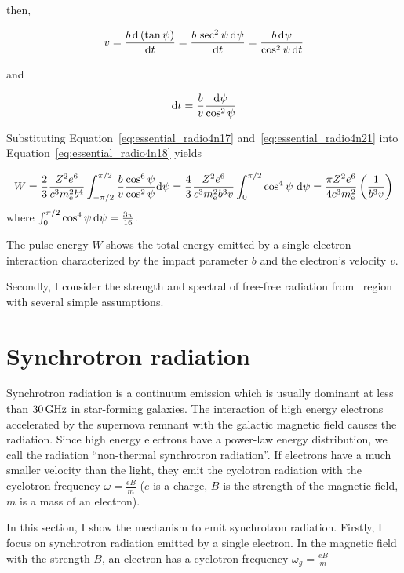 then,

\begin{equation}\label{eq:essential_radio4n20}
    v=\frac{b\,\mathrm{d}\left(\tan \psi\right)}{\mathrm{d} t}=\frac{b\,\sec ^{2} \psi\,\mathrm{d} \psi}{\mathrm{d} t}=\frac{b\,\mathrm{d} \psi}{\cos ^{2}\psi\,\mathrm{d} t}
\end{equation}

and

\begin{equation}\label{eq:essential_radio4n21}
    \mathrm{d} t=\frac{b}{v} \frac{\mathrm{d} \psi}{\cos ^{2} \psi}
\end{equation}

Substituting Equation~\ref{eq:essential_radio4n17} and~\ref{eq:essential_radio4n21} into Equation~\ref{eq:essential_radio4n18} yields

\begin{equation}\label{eq:essential_radio4n22}
    W=\frac{2}{3} \frac{Z^{2} e^{6}}{c^{3} m_{\mathrm{e}}^{2} b^{4}} \int_{-\pi / 2}^{\pi / 2} \frac{b}{v} \frac{\cos ^{6} \psi}{\cos ^{2} \psi} \mathrm{d} \psi=\frac{4}{3} \frac{Z^{2} e^{6}}{c^{3} m_{\mathrm{e}}^{2} b^{3} v} \int_{0}^{\pi / 2} \cos ^{4} \psi\ \mathrm{d} \psi = \frac{\pi Z^2 e^6}{4 c^3 m_{\mathrm{e}}^2}\left(\frac{1}{b^3v}\right)
\end{equation}
where $\int_{0}^{\pi / 2} \cos ^{4} \psi\,\mathrm{d} \psi=\frac{3 \pi}{16}$.

The pulse energy $W$ shows the total energy emitted by a single electron interaction characterized by the impact parameter $b$ and the electron's velocity $v$.\\ \vspace{0.2cm}

Secondly, I consider the strength and spectral of free-free radiation from \ih~region with several simple assumptions.



\section{Synchrotron radiation}

Synchrotron radiation is a continuum emission which is usually dominant at less than $30\,\mathrm{GHz}$ in star-forming galaxies.
The interaction of high energy electrons accelerated by the supernova remnant with the galactic magnetic field causes the radiation.
Since high energy electrons have a power-law energy distribution, we call the radiation ``non-thermal synchrotron radiation''.
If electrons have a much smaller velocity than the light, they emit the cyclotron radiation with the cyclotron frequency $\omega = \frac{eB}{m}$ ($e$ is a charge, $B$ is the strength of the magnetic field, $m$ is a mass of an electron).

In this section, I show the mechanism to emit synchrotron radiation.
Firstly, I focus on synchrotron radiation emitted by a single electron.
In the magnetic field with the strength $B$, an electron has a cyclotron frequency $\omega_g = \frac{eB}{m}$
